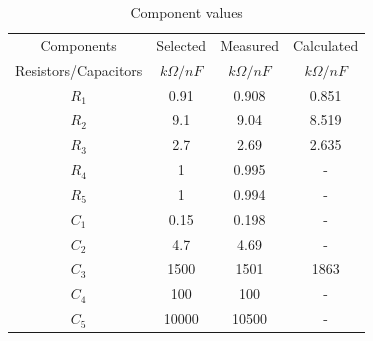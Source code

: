 \begin{table}[ht!]
\centering
\begin{tabular}{|c|c||c||c|}
    \hline
    Components & Selected & Measured & Calculated \\
    Resistors/Capacitors & $k\Omega / nF$ & $k\Omega / nF$ & $k\Omega / nF$ \\
    \hline\hline
    $R_1$ & 0.91 & 0.908 & 0.851 \\
    \hline
    $R_2$ & 9.1 & 9.04 & 8.519 \\
    \hline
    $R_3$ & 2.7 & 2.69 & 2.635 \\
    \hline
    $R_4$ & 1 & 0.995 & - \\
    \hline
    $R_5$ & 1 & 0.994 & - \\
    \hline
    $C_1$ & 0.15 & 0.198 & - \\
    \hline
    $C_2$ & 4.7 & 4.69 & - \\
    \hline
    $C_3$ & 1500 & 1501 & 1863 \\
    \hline
    $C_4$ & 100 & 100 & - \\
    \hline
    $C_5$ & 10000 & 10500 & - \\
    \hline
\end{tabular}
\captionsetup{justification=centering,singlelinecheck=true}
\caption{Component values}
\label{tab:components2}
\end{table}